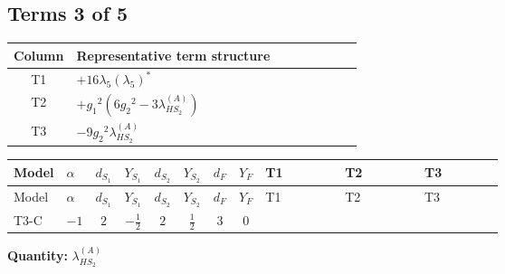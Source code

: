 \documentclass[8pt]{article}
\begin{document}
\begin{landscape}
\subsection*{Terms 3 of 5}
\begin{center}
\begin{tabular}{@{}c >{\raggedright\arraybackslash}p{0.82\linewidth}@{}}
\toprule
Column & Representative term structure \\
\midrule
T1 & \(\displaystyle +16 {\lambda_5} \left({\lambda_5}\right)^{*}\) \\
\midrule
T2 & \(\displaystyle +{g_1}^2 \left(6 {g_2}^2-3 {\lambda_{HS_2}^{(A)}}\right)\) \\
\midrule
T3 & \(\displaystyle -9 {g_2}^2 {\lambda_{HS_2}^{(A)}}\) \\
\midrule
\bottomrule
\end{tabular}
\end{center}
\smallskip
\tiny
\begin{longtable}{@{}llcccccc >{\raggedright\arraybackslash}p{0.21\linewidth} >{\raggedright\arraybackslash}p{0.21\linewidth} >{\raggedright\arraybackslash}p{0.21\linewidth}@{}}
\toprule
Model & $\alpha$ & $d_{S_1}$ & $Y_{S_1}$ & $d_{S_2}$ & $Y_{S_2}$ & $d_F$ & $Y_F$ & T1 & T2 & T3 \\
\midrule
\endfirsthead
\toprule
Model & $\alpha$ & $d_{S_1}$ & $Y_{S_1}$ & $d_{S_2}$ & $Y_{S_2}$ & $d_F$ & $Y_F$ & T1 & T2 & T3 \\
\midrule
\endhead
T3-C & $-1$ & $2$ & $-\frac{1}{2}$ & $2$ & $\frac{1}{2}$ & $3$ & $0$ & \scriptsize\adjustbox{max width=\linewidth}{$\begin{gathered} +16 {\lambda_5} \left({\lambda_5}\right)^{*}\end{gathered}$} & \scriptsize\adjustbox{max width=\linewidth}{$\begin{gathered} +{g_1}^2 \left(6 {g_2}^2-3 {\lambda_{HS_2}^{(A)}}\right)\end{gathered}$} & \scriptsize\adjustbox{max width=\linewidth}{$\begin{gathered} -9 {g_2}^2 {\lambda_{HS_2}^{(A)}}\end{gathered}$} \\
\midrule
\bottomrule
\end{longtable}
\clearpage
\noindent\textbf{Quantity: }$\lambda_{HS_2}^{(A)}$\par\smallskip

\end{landscape}
\end{document}
